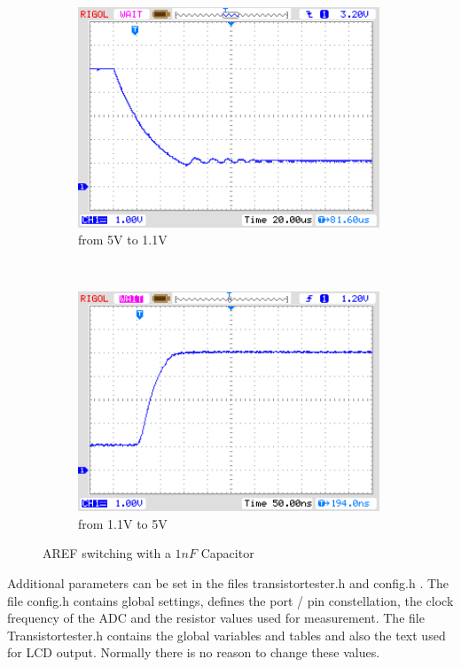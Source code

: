 \begin{figure}[H]
  \begin{subfigure}[b]{9cm}
    \centering
    \includegraphics[width=9cm]{../PNG/AREF2_1V.png}
    \caption{from 5V to 1.1V }
    \label{pic:aref1}
  \end{subfigure}
  ~
  \begin{subfigure}[b]{9cm}
    \centering
    \includegraphics[width=9cm]{../PNG/AREF2VCC.png}
    \caption{from 1.1V to 5V}
    \label{pic:aref5}
  \end{subfigure}
  \caption{AREF switching with a \(1nF\) Capacitor}
\end{figure}


Additional parameters can be set in the files transistortester.h and config.h .
The file config.h contains global settings, defines the port / pin constellation,
 the clock frequency of the ADC and the resistor values used for measurement.
The file Transistortester.h contains the global variables and tables and also the text used for LCD output.
Normally there is no reason to change these values.
